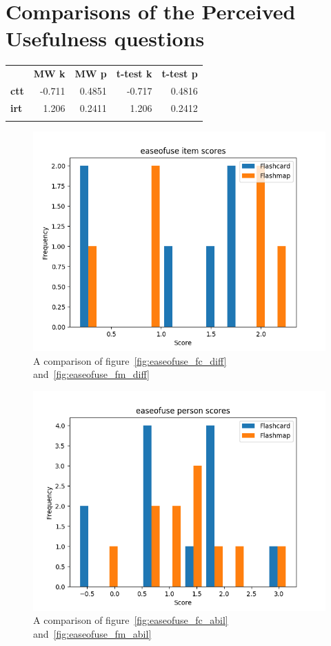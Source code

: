 \FloatBarrier
\section{Comparisons of the Perceived Usefulness questions}

\begin{longtable}[c]{@{}lrrrr@{}}
\toprule\addlinespace
& \textbf{MW k} & \textbf{MW p} &
\textbf{t-test k} & \textbf{t-test p}
\\\addlinespace
\midrule
\textbf{ctt} & -0.711 & 0.4851 & -0.717 & 0.4816
\\\addlinespace
\textbf{irt} & 1.206 & 0.2411 & 1.206 & 0.2412
\\\addlinespace
\bottomrule
    \label{tab:easeofuse_comp}
\end{longtable}

\begin{figure}
    \centering
    \includegraphics[width=.7\textwidth]{img/easeofuse_diff.png}
    \caption{A comparison of figure~\protect\ref{fig:easeofuse_fc_diff} and~\protect\ref{fig:easeofuse_fm_diff}}
    \label{fig:easeofuse_diff}
\end{figure}
\begin{figure}
    \centering
    \includegraphics[width=.7\textwidth]{img/easeofuse_abil.png}
    \caption{A comparison of figure~\protect\ref{fig:easeofuse_fc_abil} and~\protect\ref{fig:easeofuse_fm_abil}}
    \label{fig:easeofuse_abil}
\end{figure}
